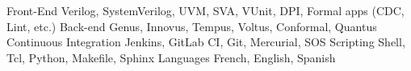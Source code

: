 

\begin{cvskills}

  \cvskill
    {Front-End} %
    {Verilog, SystemVerilog, UVM, SVA, VUnit, DPI, Formal apps (CDC, Lint, etc.)} %
  \cvskill
    {Back-end} %
    {Genus, Innovus, Tempus, Voltus, Conformal, Quantus} %
  \cvskill
    {Continuous Integration} %
    {Jenkins, GitLab CI, Git, Mercurial, SOS} %
  \cvskill
    {Scripting} %
    {Shell, Tcl, Python, Makefile, Sphinx} %
  \cvskill
    {Languages} %
    {French, English, Spanish} %

\end{cvskills}
